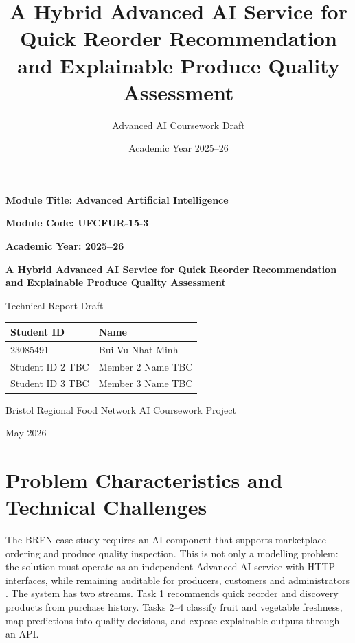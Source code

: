 \documentclass[11pt,a4paper]{article}
\title{A Hybrid Advanced AI Service for Quick Reorder Recommendation and Explainable Produce Quality Assessment}
\author{Advanced AI Coursework Draft}
\date{Academic Year 2025--26}
\begin{document}
\begin{titlepage}
\centering
\vspace*{1.5cm}

{\Large \textbf{Module Title: Advanced Artificial Intelligence}\par}
\vspace{0.3cm}
{\large \textbf{Module Code: UFCFUR-15-3}\par}
\vspace{0.3cm}
{\large \textbf{Academic Year: 2025--26}\par}

\vspace{1.8cm}
{\LARGE \textbf{A Hybrid Advanced AI Service for Quick Reorder Recommendation and Explainable Produce Quality Assessment}\par}

\vspace{1.2cm}
{\large Technical Report Draft\par}

\vspace{1.8cm}
\begin{tabular}{ll}
\toprule
\textbf{Student ID} & \textbf{Name} \\
\midrule
23085491 & Bui Vu Nhat Minh \\
Student ID 2 TBC & Member 2 Name TBC \\
Student ID 3 TBC & Member 3 Name TBC \\
\bottomrule
\end{tabular}

\vfill
{\large Bristol Regional Food Network AI Coursework Project\par}
\vspace{0.2cm}
{\large May 2026\par}
\end{titlepage}

\section{Problem Characteristics and Technical Challenges}
The BRFN case study requires an AI component that supports marketplace ordering and produce quality inspection. This is not only a modelling problem: the solution must operate as an independent Advanced AI service with HTTP interfaces, while remaining auditable for producers, customers and administrators \citep{uwe_ai_spec_2026,uwe_case_study_2026}. The system has two streams. Task 1 recommends quick reorder and discovery products from purchase history. Tasks 2--4 classify fruit and vegetable freshness, map predictions into quality decisions, and expose explainable outputs through an API.
\end{document}
